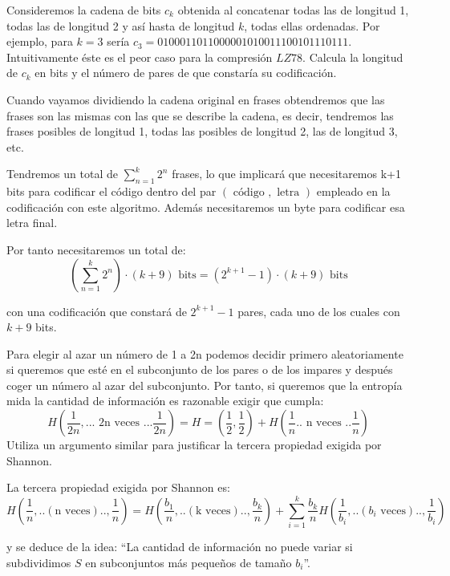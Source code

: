 \begin{problem}[17]
Consideremos la cadena de bits $c_k$ obtenida al concatenar todas las de longitud 1, todas las de longitud 2 y así hasta de longitud $k$, todas ellas ordenadas. Por ejemplo, para $k=3$ sería $c_3=0100011011000001010011100101110111$. Intuitivamente éste es el peor caso para la compresión $LZ78$. Calcula la longitud de $c_k$ en bits y el número de pares de que constaría su codificación.
\solution

\yoP

Cuando vayamos dividiendo la cadena original en frases obtendremos que las frases son las mismas con las que se describe la cadena, es decir, tendremos las frases posibles de longitud 1, todas las posibles de longitud 2, las de longitud 3, etc.

Tendremos un total de $\sum_{n=1}^k 2^n$ frases, lo que implicará que necesitaremos k+1 bits para codificar el código dentro del par $(\text{ código }, \text{ letra })$ empleado en la codificación con este algoritmo. Además necesitaremos un byte para codificar esa letra final.

Por tanto necesitaremos un total de:
\[\left(\sum_{n=1}^k 2^n\right)\cdot (k+9) \text{ bits} = (2^{k+1}-1)\cdot (k+9) \text{ bits}\]

con una codificación que constará de $2^{k+1} -1 $ pares, cada uno de los cuales con $k+9$ bits.

\end{problem}

\begin{problem}[18]
Para elegir al azar un número de 1 a 2n podemos decidir primero aleatoriamente si queremos que esté en el subconjunto de los pares o de los impares y después coger un número al azar del subconjunto. Por tanto, si queremos que la entropía mida la cantidad de información es razonable exigir que cumpla:
\[H \left( \frac{1}{2n},... \text{ 2n veces } ... \frac{1}{2n}\right)=H=\left(\frac{1}{2},\frac{1}{2}\right)+H \left(\frac{1}{n} .. \text{ n veces }.. \frac{1}{n} \right)\]
Utiliza un argumento similar para justificar la tercera propiedad exigida por Shannon.
\solution

\yoP

La tercera propiedad exigida por Shannon es:
\[H\left(\frac{1}{n},..(\text{n veces})..,\frac{1}{n}\right) =  H\left(\frac{b_1}{n},..(\text{k veces})..,\frac{b_k}{n}\right) + \sum^{k}_{i = 1} \frac{b_k}{n} H\left(\frac{1}{b_i},..(b_i \text{ veces})..,\frac{1}{b_i}\right) \]

y se deduce de la idea: ``La cantidad de información no puede variar si subdividimos $S$ en subconjuntos más pequeños de tamaño $b_i$''.
\end{problem}

